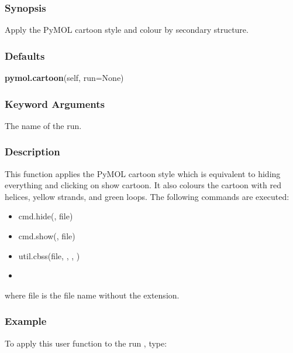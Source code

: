   
 \subsubsection{Synopsis} 

 Apply the PyMOL cartoon style and colour by secondary structure. 
  

  
 \subsubsection{Defaults} 

 \textsf{\textbf{pymol.cartoon}(self, run=None)} 

  
 \subsubsection{Keyword Arguments} 

   The name of the run.  

  

  
 \subsubsection{Description} 

 This function applies the PyMOL cartoon style which is equivalent to hiding everything and clicking on show cartoon.  It also colours the cartoon with red helices, yellow strands, and green loops.  The following commands are executed: 
  

 \begin{itemize} 
 \item[] cmd.hide(, file)  
 \item[] cmd.show(, file)  
 \item[] util.cbss(file, , , )  
 \item[]  
 \end{itemize} 
  

 where file is the file name without the  extension. 
  

  
 \subsubsection{Example} 

 To apply this user function to the run , type: 
  


